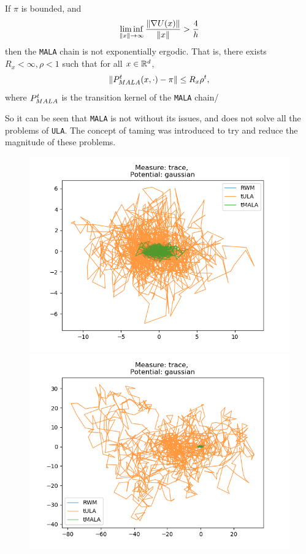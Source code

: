\begin{theorem}
	If \(\pi\) is bounded, and
		\[\liminf_{\|x\|\to \infty} \frac{\|\nabla U(x)\|}{\|x\|} > \frac{4}{h}\]
	then the \texttt{MALA} chain is not exponentially ergodic. That is, there exists \(R_x <\infty, \rho<1\) such that for all \(x\in \mathbb{R}^d\),
	\[\|P^t_{\tiny \sc MALA}(x,\cdot) - \pi \| \leq R_x\rho^t,\]
	where \(P^t_{\tiny \sc MALA}\) is the transition kernel of the \texttt{MALA} chain/
\end{theorem}
So it can be seen that \texttt{MALA} is not without its issues, and does not solve all the problems of \texttt{ULA}. The concept of taming was introduced to try and reduce the magnitude of these problems.
\begin{figure}[H]
\centering
  \begin{minipage}[b]{0.49\textwidth}
  \centering
    \includegraphics[width=\textwidth]{Figures/tula_tmala_step_1.png}
  \end{minipage} %
  \begin{minipage}[b]{0.49\textwidth}
  \centering
    \includegraphics[width=\textwidth]{Figures/tula_tmala_step_10.png}

\end{minipage}
\end{figure}
